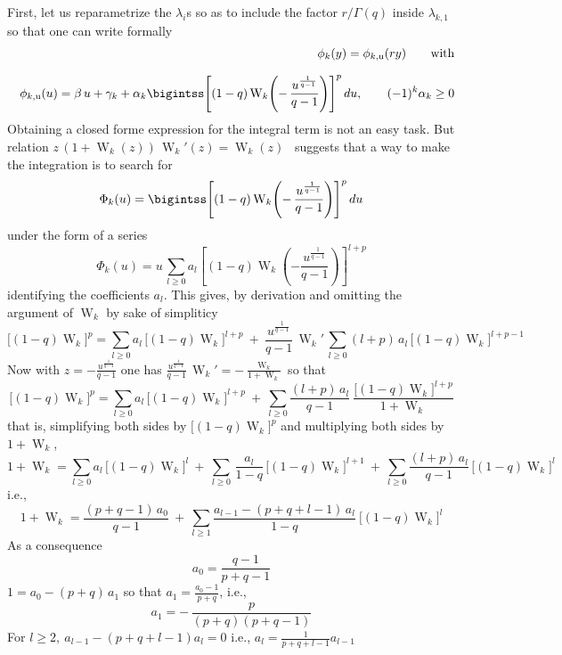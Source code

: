 \documentclass[entropy,article,submit,moreauthors,pdftex]{Definitions/mdpi}
\def\W{\operatorname{W}} %
\def\u{\mathrm{u}}
\begin{document}
First,  let us  reparametrize  the  $\lambda_i$s so  as  to  include the  factor
$r/\Gamma(q)$ inside $\lambda_{k,1}$ so that one can write formally
%
\begin{eqnarray}
  &&\phi_k(y) = \phi_{k,\u}(r y) \qquad \mbox{with}
  \\[2.5mm]
&& \phi_{k,\u}(u) = \beta \, u
+    \gamma_k    +   \alpha_k    \bigintss    \left[    (1-q)   \W_k\left(    -    \,
  \frac{u^{\frac{1}{q-1}}}{q-1} \right) \right]^p \, du, \qquad (-1)^k \alpha_k \ge 0 \nonumber
\end{eqnarray}
%
Obtaining  a closed  forme  expression for  the  integral term  is  not an  easy
task.     But     relation    $z     \,     (1+\W_k(z))     \,    \W_k'(z)     =
\W_k(z)$~\cite[Eq.~3.2]{CorGon96} suggests that a way to make the integration is
to search for
%
\begin{equation}
\Phi_k(u) =  \bigintss \left[ (1-q) \W_k\left(  - \, \frac{u^{\frac{1}{q-1}}}{q-1}
  \right) \right]^p \, du
\end{equation}
%
under the form of a series
%
\[
\Phi_k(u)   =   u   \,   \sum_{l   \ge  0}   a_l   \left[   (1-q)   \W_k\left(   -
  \frac{u^{\frac{1}{q-1}}}{q-1} \right) \right]^{l+p}
\]
%
identifying the coefficients  $a_l$. This gives, by derivation  and omitting the
argument of $\W_k$ by sake of simpliticy
%
\[
\Big[ (1-q) \W_k \Big]^p = \sum_{l \ge 0} a_l \, \Big[ (1-q) \W_k \Big]^{l+p} \:
+ \:  \frac{u^{\frac{1}{q-1}}}{q-1} \, \W_k' \,  \sum_{l \ge 0} (l+p)  \, a_l \,
\Big[ (1-q) \W_k \Big]^{l+p-1}
\]
%
Now      with     $z      =     -\frac{u^{\frac{1}{q-1}}}{q-1}$      one     has
$\frac{u^{\frac{1}{q-1}}}{q-1} \, \W_k' = - \frac{\W_k}{1+\W_k}$ so that
%
\[
\Big[ (1-q) \W_k \Big]^p = \sum_{l \ge 0} a_l \, \Big[ (1-q) \W_k \Big]^{l+p} \:
+  \:  \sum_{l  \ge  0}  \frac{(l+p) \,  a_l}{q-1}  \:  \frac{\Big[  (1-q)  \W_k
    \Big]^{l+p}}{1+\W_k}
\]
%
that is, simplifying  both sides by $\Big[ (1-q) \W_k  \Big]^p $ and multiplying
both sides by $1 + \W_k$,
%
\[
1 + \W_k = \sum_{l \ge 0} a_l \, \Big[ (1-q) \W_k \Big]^l \: + \: \sum_{l \ge
  0} \, \frac{a_l}{1-q}  \, \Big[ (1-q) \W_k \Big]^{l+1} \:  + \: \sum_{l \ge
  0} \frac{(l+p) \, a_l}{q-1} \, \Big[ (1-q) \W_k \Big]^l
\]
%
i.e.,
%
\[
1 + \W_k = \frac{(p+q-1) \, a_0}{q-1} \: +  \: \sum_{l \ge 1} \frac{a_{l-1} - (p + q + l -
  1) \, a_l}{1-q} \: \Big[ (1-q) \W_k \Big]^l
\]
%
As a consequence
%
\[
a_0 = \frac{q-1}{p+q-1}
\]
%
$1 = a_0 - (p + q) \, a_1$ so that $a_1 = \frac{a_0-1}{p+q}$, i.e.,
\[
a_1 = - \, \frac{p}{(p+q) (p+q-1)}
\]
%
For $l \ge 2, \: a_{l-1} - (p+q+l-1) a_l = 0$ i.e., $a_l = \frac{1}{p+q+l-1} a_{l-1}$
\end{document}
